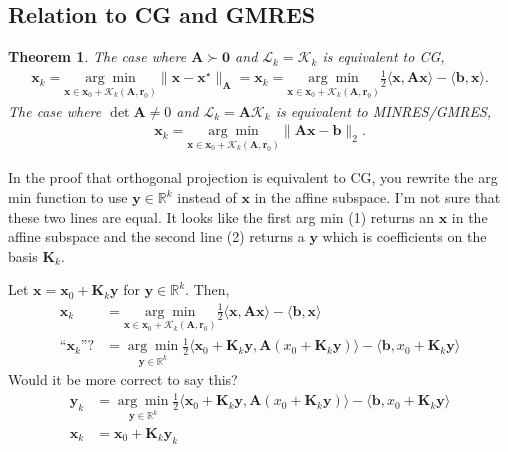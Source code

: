 \documentclass[12pt,a4paper]{article} %
\newtheorem*{theorem}{Theorem}
\begin{document}
\subsection{Relation to CG and GMRES}
\begin{theorem}
    The case where $\mathbf A \succ \bm 0$ and $\mathcal L_k = \mathcal K_k$
    is equivalent to CG, 
    \begin{align*}
        \bm x_k = \underset{\bm x \in \bm x_0 + \mathcal K_k(\mathbf A, \bm r_0)}{\arg \min } \| \bm x - \bm x^\star \|_\mathbf A = \bm x_k = \underset{\bm x \in \bm x_0 + \mathcal K_k(\mathbf A, \bm r_0)}{\arg \min } \frac{1}{2} \langle \bm x, \mathbf A \bm x \rangle - \langle \bm b, \bm x \rangle.
    \end{align*}
    The case where $\det \mathbf A \ne 0$ and $\mathcal L_k = \mathbf A \mathcal K_k$ 
    is equivalent to MINRES/GMRES,
    \begin{align*}
        \bm x_k = \underset{\bm x \in \bm x_0 + \mathcal K_k(\mathbf A, \bm r_0)}{\arg \min } \| \mathbf A \bm x - \bm b \|_2.
    \end{align*}
\end{theorem}

\newpage
In the proof that orthogonal projection is equivalent to CG, you rewrite the 
arg min function to use $\bm y \in \mathbb R^k$ instead of $\bm x$ in the affine 
subspace. I'm not sure that these two lines are equal. It looks like the first arg min (1) returns 
an $\bm x$ in the affine subspace and the second line (2) returns a $\bm y$ 
which is coefficients on the basis $\mathbf K_k$.

    Let $\bm x = \bm x_0 + \mathbf K_k \bm y$ for $\bm y \in \mathbb R^k$. Then, 
    \begin{align}
        \bm x_k &= \underset{\bm x \in \bm x_0 + \mathcal K_k(\mathbf A, \bm r_0)}{\arg \min } \frac{1}{2} \langle \bm x, \mathbf A \bm x \rangle - \langle \bm b, \bm x \rangle \\ 
        \text{``$\bm x_k$''?}& = \underset{\bm y \in \mathbb R^k} {\arg \min} \frac{1}{2} \langle \bm x_0 + \mathbf K_k \bm y, \mathbf A(x_0 + \mathbf K_k \bm y)\rangle - \langle \bm b, x_0 + \mathbf K_k \bm y \rangle
    \end{align}
    Would it be more correct to say this?
    \begin{align*}
        \bm y_k &= \underset{\bm y \in \mathbb R^k} {\arg \min} \frac{1}{2} \langle \bm x_0 + \mathbf K_k \bm y, \mathbf A(x_0 + \mathbf K_k \bm y)\rangle - \langle \bm b, x_0 + \mathbf K_k \bm y \rangle \\
        \bm x_k &= \bm x_0 + \mathbf K_k \bm y_k
    \end{align*}
\end{document}
